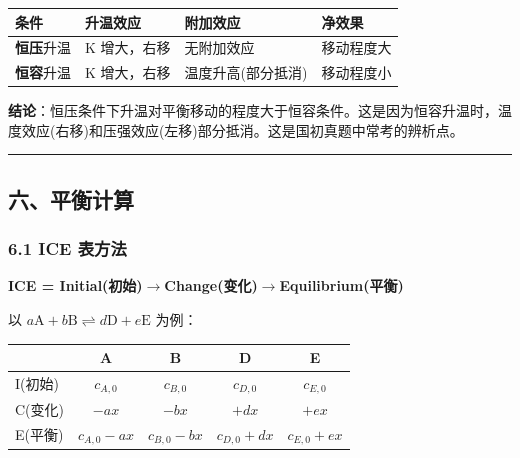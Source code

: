 \documentclass[a4paper,11pt]{ctexart}
\newcounter{none}
\newcommand{\箭}{\ensuremath{\rightarrow}}
\newcommand{\左箭}{\ensuremath{\leftarrow}}
\newcommand{\上箭}{\ensuremath{\uparrow}}
\newcommand{\下箭}{\ensuremath{\downarrow}}
\newcommand{\衡}{\ensuremath{\rightleftharpoons}}
\newcommand{\双箭}{\ensuremath{\leftrightarrow}}
\newcommand{\约等于}{\ensuremath{\approx}}
\newcommand{\小于等于}{\ensuremath{\leq}}
\newcommand{\大于等于}{\ensuremath{\geq}}
\newcommand{\不等于}{\ensuremath{\neq}}
\newcommand{\西格马}{\ensuremath{\sigma}}
\newcommand{\派}{\ensuremath{\pi}}
\begin{document}
{\def\LTcaptype{none} %
\begin{longtable}[]{@{}
  >{\raggedright\arraybackslash}p{}
  >{\raggedright\arraybackslash}p{}
  >{\raggedright\arraybackslash}p{}
  >{\raggedright\arraybackslash}p{}@{}}
\toprule\noalign{}
\begin{minipage}[b]{\linewidth}\raggedright
条件
\end{minipage} & \begin{minipage}[b]{\linewidth}\raggedright
升温效应
\end{minipage} & \begin{minipage}[b]{\linewidth}\raggedright
附加效应
\end{minipage} & \begin{minipage}[b]{\linewidth}\raggedright
净效果
\end{minipage} \\
\midrule\noalign{}
\endhead
\bottomrule\noalign{}
\endlastfoot
\textbf{恒压}升温 & K 增大，右移 & 无附加效应 & 移动程度大 \\
\textbf{恒容}升温 & K 增大，右移 & 温度升高(部分抵消) & 移动程度小 \\
\end{longtable}
}

\textbf{结论}：恒压条件下升温对平衡移动的程度大于恒容条件。这是因为恒容升温时，温度效应(右移)和压强效应(左移)部分抵消。这是国初真题中常考的辨析点。

\begin{center}\rule{0.5\linewidth}{0.5pt}\end{center}

\subsection{六、平衡计算}\label{ux516dux5e73ux8861ux8ba1ux7b97}

\subsubsection{6.1 ICE 表方法}\label{ice-ux8868ux65b9ux6cd5}

\textbf{ICE = Initial(初始)\箭 Change(变化)\箭 Equilibrium(平衡)}

以 \(a\mathrm{A} + b\mathrm{B} \rightleftharpoons d\mathrm{D} + e\mathrm{E}\) 为例：

{\def\LTcaptype{none} %
\begin{longtable}[]{@{}lcccc@{}}
\toprule\noalign{}
& A & B & D & E \\
\midrule\noalign{}
\endhead
\bottomrule\noalign{}
\endlastfoot
I(初始) & \(c_{A,0}\) & \(c_{B,0}\) & \(c_{D,0}\) & \(c_{E,0}\) \\
C(变化) & \(-ax\) & \(-bx\) & \(+dx\) & \(+ex\) \\
E(平衡) & \(c_{A,0}-ax\) & \(c_{B,0}-bx\) & \(c_{D,0}+dx\) & \(c_{E,0}+ex\) \\
\end{longtable}
}
\end{document}
